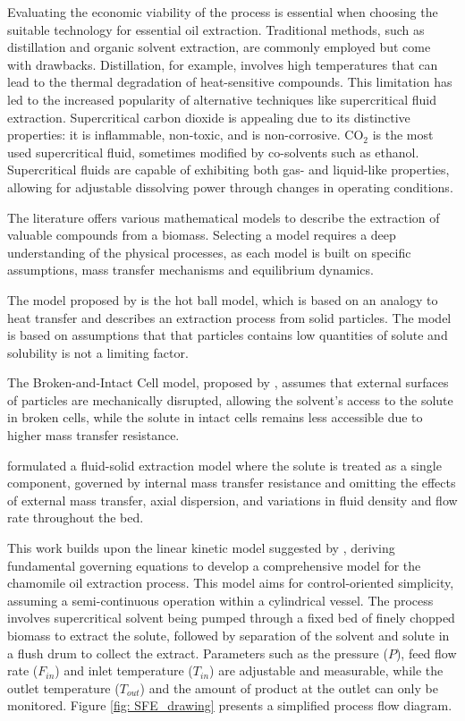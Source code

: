 \documentclass[../Article_Model_Parameters.tex]{subfiles}
\begin{document}
	Evaluating the economic viability of the process is essential when choosing the suitable technology for essential oil extraction. Traditional methods, such as distillation and organic solvent extraction, are commonly employed but come with drawbacks. Distillation, for example, involves high temperatures that can lead to the thermal degradation of heat-sensitive compounds. This limitation has led to the increased popularity of alternative techniques like supercritical fluid extraction. Supercritical carbon dioxide is appealing due to its distinctive properties: it is inflammable, non-toxic, and is non-corrosive.  CO$_2$ is the most used supercritical fluid, sometimes modified by co-solvents such as ethanol. Supercritical fluids are capable of exhibiting both gas- and liquid-like properties, allowing for adjustable dissolving power through changes in operating conditions.
	
	The literature offers various mathematical models to describe the extraction of valuable compounds from a biomass. Selecting a model requires a deep understanding of the physical processes, as each model is built on specific assumptions, mass transfer mechanisms and equilibrium dynamics.
	
	The model proposed by \citet{Reverchon1993} is the hot ball model, which is based on an analogy to heat transfer and describes an extraction process from solid particles. The model is based on assumptions that that particles contains low quantities of solute and solubility is not a limiting factor.
	
	The Broken-and-Intact Cell model, proposed by \citet{Sovova1994}, assumes that external surfaces of particles are mechanically disrupted, allowing the solvent's access to the solute in broken cells, while the solute in intact cells remains less accessible due to higher mass transfer resistance.
	
	\citet{Reverchon1996} formulated a fluid-solid extraction model where the solute is treated as a single component, governed by internal mass transfer resistance and omitting the effects of external mass transfer, axial dispersion, and variations in fluid density and flow rate throughout the bed.
	
	This work builds upon the linear kinetic model suggested by \citet{Reverchon1996}, deriving fundamental governing equations to develop a comprehensive model for the chamomile oil extraction process. This model aims for control-oriented simplicity, assuming a semi-continuous operation within a cylindrical vessel. The process involves supercritical solvent being pumped through a fixed bed of finely chopped biomass to extract the solute, followed by separation of the solvent and solute in a flush drum to collect the extract. Parameters such as the pressure ($P$), feed flow rate ($F_{in}$) and inlet temperature ($T_{in}$) are adjustable and measurable, while the outlet temperature ($T_{out}$) and the amount of product at the outlet can only be monitored. Figure \ref{fig: SFE_drawing} presents a simplified process flow diagram.
	
\end{document}

